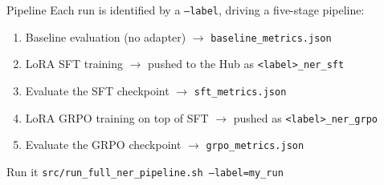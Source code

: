 \begin{frame}[fragile]{Pipeline}
  Each run is identified by a \texttt{--label}, driving a five-stage pipeline:
  \begin{enumerate}
    \item Baseline evaluation (no adapter) $\rightarrow$ \texttt{baseline\_metrics.json}
    \item LoRA SFT training $\rightarrow$ pushed to the Hub as \texttt{<label>\_ner\_sft}
    \item Evaluate the SFT checkpoint $\rightarrow$ \texttt{sft\_metrics.json}
    \item LoRA GRPO training on top of SFT $\rightarrow$ pushed as \texttt{<label>\_ner\_grpo}
    \item Evaluate the GRPO checkpoint $\rightarrow$ \texttt{grpo\_metrics.json}
  \end{enumerate}
  \begin{exampleblock}{Run it}
    \texttt{src/run\_full\_ner\_pipeline.sh --label=my\_run}
  \end{exampleblock}
\end{frame}
